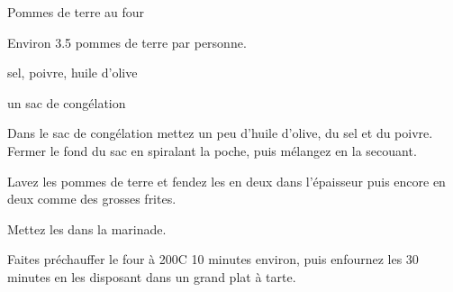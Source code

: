 \begin{recette}{Pommes de terre au four}
\begin{ingredients}
\item Environ 3.5 pommes de terre par personne.
\item sel, poivre, huile d'olive
\item un sac de congélation
\end{ingredients}

\begin{preparation}
\item Dans le sac de congélation mettez un peu d'huile d'olive, du sel et du poivre. Fermer le fond du sac en spiralant la poche, puis mélangez en la secouant.
\item Lavez les pommes de terre et fendez les en deux dans l'épaisseur puis encore en deux comme des grosses frites.
\item Mettez les dans la marinade.
\end{preparation}

\begin{cuisson}
Faites préchauffer le four à 200\degres C 10 minutes environ, puis enfournez les 30 minutes en les disposant dans un grand plat à tarte.
\end{cuisson}

\end{recette}

